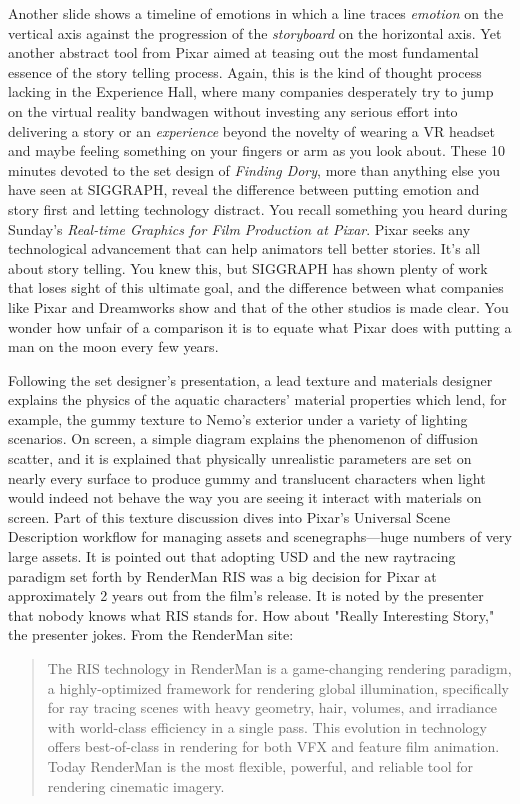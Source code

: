 \documentclass[../main.tex]{subfiles}
\begin{document}
Another slide shows a timeline of emotions in which a line traces \textit{emotion} on the vertical axis against the progression of the \textit{storyboard} on the horizontal axis. Yet another abstract tool from Pixar aimed at teasing out the most fundamental essence of the story telling process. Again, this is the kind of thought process lacking in the Experience Hall, where many companies desperately try to jump on the virtual reality bandwagen without investing any serious effort into delivering a story or an \textit{experience} beyond the novelty of wearing a VR headset and maybe feeling something on your fingers or arm as you look about. These 10 minutes devoted to the set design of \textit{Finding Dory}, more than anything else you have seen at SIGGRAPH, reveal the difference between putting emotion and story first and letting technology distract. You recall something you heard during Sunday's \textit{Real-time Graphics for Film Production at Pixar}. Pixar seeks any technological advancement that can help animators tell better stories. It's all about story telling. You knew this, but SIGGRAPH has shown plenty of work that loses sight of this ultimate goal, and the difference between what companies like Pixar and Dreamworks show and that of the other studios is made clear. You wonder how unfair of a comparison it is to equate what Pixar does with putting a man on the moon every few years.

Following the set designer's presentation, a lead texture and materials designer explains the physics of the aquatic characters' material properties which lend, for example, the gummy texture to Nemo's exterior under a variety of lighting scenarios. On screen, a simple diagram explains the phenomenon of diffusion scatter, and it is explained that physically unrealistic parameters are set on nearly every surface to produce gummy and translucent characters when light would indeed not behave the way you are seeing it interact with materials on screen. Part of this texture discussion dives into Pixar's Universal Scene Description workflow for managing assets and scenegraphs---huge numbers of very large assets. It is pointed out that adopting USD and the new raytracing paradigm set forth by RenderMan RIS was a big decision for Pixar at approximately 2 years out from the film's release. It is noted by the presenter that nobody knows what RIS stands for. How about "Really Interesting Story," the presenter jokes. From the RenderMan site:

\begin{quote}
The RIS technology in RenderMan is a game-changing rendering paradigm, a highly-optimized framework for rendering global illumination, specifically for ray tracing scenes with heavy geometry, hair, volumes, and irradiance with world-class efficiency in a single pass. This evolution in technology offers best-of-class in rendering for both VFX and feature film animation. Today RenderMan is the most flexible, powerful, and reliable tool for rendering cinematic imagery.  
\end{quote}
\end{document}

